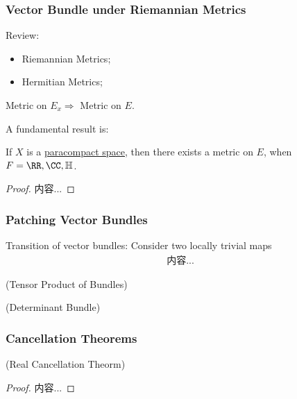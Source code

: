 \documentclass[Total.tex]{subfiles}
\begin{document}
	\subsubsection{Vector Bundle under Riemannian Metrics}
	
	Review:
	
	\begin{itemize}
		\item Riemannian Metrics;
		\item Hermitian Metrics;
	\end{itemize}
	
	Metric on $E_x\Rightarrow$ Metric on $E$.
	
	A fundamental result is:
	
	\begin{theorem}
		\label{Algebraic-K-Theory-Vector-Bundles-Metrics-on-Paracompact-Space}If $X$ is a \underline{paracompact space}, then there exists a metric on $E$, when $F=\RR,\CC,\mathbb{H}$.
	\end{theorem}
	\begin{proof}
		内容...
	\end{proof}
	
	\subsubsection{Patching Vector Bundles}
	
	{\LARGE T}ransition of vector bundles: Consider two locally trivial maps
	\begin{gather*}
		内容...
	\end{gather*}
	
	\begin{Def}
		(Tensor Product of Bundles)
	\end{Def}
	
	\begin{Def}
		(Determinant Bundle)
	\end{Def}
	
	\subsubsection{Cancellation Theorems}
	
	\begin{theorem}
		(Real Cancellation Theorm)
	\end{theorem}
	
	\begin{proof}
		内容...
	\end{proof}
	
\end{document}
